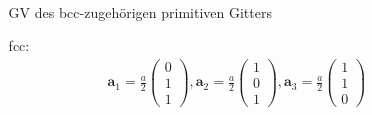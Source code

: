 \begin{itemize}
\begin{itemize}
\begin{align*}
                    \end{align*}
                    GV des bcc-zugehörigen primitiven Gitters
              \item[fcc:]
                    \begin{align*}
                        \textbf{a}_1 = \frac{a}{2} \left(\begin{array}{c} 0 \\ 1 \\ 1 \end{array}\right), \textbf{a}_2 = \frac{a}{2} \left(\begin{array}{c} 1 \\ 0 \\ 1 \end{array}\right), \textbf{a}_3 = \frac{a}{2} \left(\begin{array}{c} 1 \\ 1 \\ 0 \end{array}\right)
                    \end{align*}
          \end{itemize}


\end{itemize}
